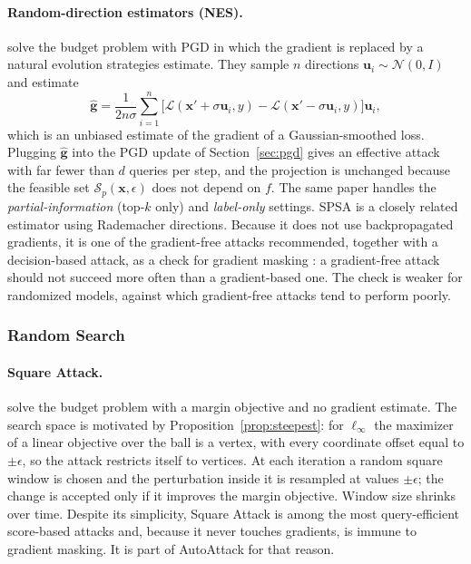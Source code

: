 \documentclass[10pt,a4paper]{extarticle}
\theoremstyle{definition}
\newcommand{\Loss}{\mathcal{L}}
\newcommand{\x}{\mathbf{x}}
\newcommand{\xadv}{\mathbf{x}'}
\begin{document}
\paragraph{Random-direction estimators (NES).} \citet{ilyas2018blackbox} solve the budget problem with PGD in which the gradient is replaced by a natural evolution strategies estimate. They sample \(n\) directions \(\mathbf{u}_i\sim\mathcal{N}(0,I)\) and estimate
\begin{equation}\label{eq:nes}
\hat{\mathbf{g}} = \frac{1}{2n\sigma}\sum_{i=1}^{n}\big[\Loss(\xadv+\sigma\mathbf{u}_i,y)-\Loss(\xadv-\sigma\mathbf{u}_i,y)\big]\mathbf{u}_i,
\end{equation}
which is an unbiased estimate of the gradient of a Gaussian-smoothed loss. Plugging \(\hat{\mathbf{g}}\) into the PGD update of Section~\ref{sec:pgd} gives an effective attack with far fewer than \(d\) queries per step, and the projection is unchanged because the feasible set \(\mathcal{S}_p(\x,\epsilon)\) does not depend on \(f\). The same paper handles the \emph{partial-information} (top-\(k\) only) and \emph{label-only} settings. SPSA \citep{uesato2018adversarial} is a closely related estimator using Rademacher directions. Because it does not use backpropagated gradients, it is one of the gradient-free attacks recommended, together with a decision-based attack, as a check for gradient masking \citep{carlini2019evaluating}: a gradient-free attack should not succeed more often than a gradient-based one. The check is weaker for randomized models, against which gradient-free attacks tend to perform poorly.

\subsubsection{Random Search}

\paragraph{Square Attack.} \citet{andriushchenko2020square} solve the budget problem with a margin objective and no gradient estimate. The search space is motivated by Proposition~\ref{prop:steepest}: for \(\ell_\infty\) the maximizer of a linear objective over the ball is a vertex, with every coordinate offset equal to \(\pm\epsilon\), so the attack restricts itself to vertices. At each iteration a random square window is chosen and the perturbation inside it is resampled at values \(\pm\epsilon\); the change is accepted only if it improves the margin objective. Window size shrinks over time. Despite its simplicity, Square Attack is among the most query-efficient score-based attacks and, because it never touches gradients, is immune to gradient masking. It is part of AutoAttack for that reason.
\end{document}
